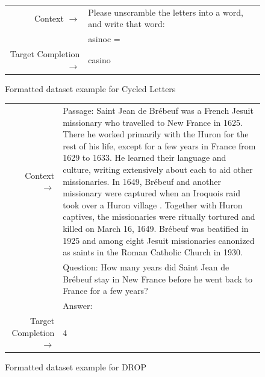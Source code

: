 \begin{figure} { \tt \footnotesize \begin{tabularx}{\linewidth}{r X} \toprule Context $\to$ & Please unscramble the letters into a word, and write that word: \\
& asinoc = \\ 
 \midrule Target Completion $\to$ & casino\\ \bottomrule \end{tabularx} }  \caption{Formatted dataset example for Cycled Letters}
 \label{eval:CL}  
 \end{figure}%
\begin{figure} { \tt \footnotesize \begin{tabularx}{\linewidth}{r X} \toprule Context $\to$ & Passage: Saint Jean de Br\'ebeuf  was a French Jesuit missionary who travelled to New France  in 1625. There he worked primarily with the Huron for the rest of his life, except for a few years in France from 1629 to 1633. He learned their language and culture, writing extensively about each to aid other missionaries. In 1649, Br\'ebeuf and another missionary were captured when an Iroquois raid took over a Huron village . Together with Huron captives, the missionaries were ritually tortured and killed on March 16, 1649. Br\'ebeuf was beatified in 1925 and among eight Jesuit missionaries canonized as saints in the Roman Catholic Church in 1930. \\ 
 & Question: How many years did Saint Jean de Br\'ebeuf stay in New France before he went back to France for a few years? \\ 
 & Answer: \\ 
 \midrule Target Completion $\to$ & 4 \\
\bottomrule \end{tabularx} }  \caption{Formatted dataset example for DROP}  \label{eval:DROP}  \end{figure}%
